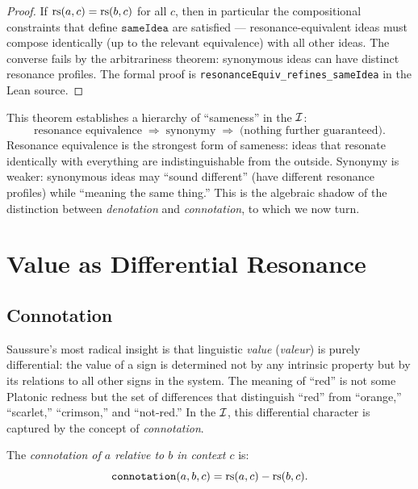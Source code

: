 \begin{proof}
If $\mathrm{rs}(a, c) = \mathrm{rs}(b, c)$ for all $c$, then in particular the
compositional constraints that define $\texttt{sameIdea}$ are
satisfied --- resonance-equivalent ideas must compose identically
(up to the relevant equivalence) with all other ideas. The converse
fails by the arbitrariness theorem: synonymous ideas can have
distinct resonance profiles. The formal proof is
\texttt{resonanceEquiv\_refines\_sameIdea} in the Lean source.
\end{proof}

\begin{interpretation}
This theorem establishes a hierarchy of ``sameness'' in the $\mathcal{I}$:
\[
  \text{resonance equivalence} \;\Longrightarrow\;
  \text{synonymy} \;\Longrightarrow\;
  \text{(nothing further guaranteed)}.
\]
Resonance equivalence is the strongest form of sameness: ideas that
resonate identically with everything are indistinguishable from the
outside. Synonymy is weaker: synonymous ideas may ``sound different''
(have different resonance profiles) while ``meaning the same thing.''
This is the algebraic shadow of the distinction between
\textit{denotation} and \textit{connotation}, to which we now turn.
\end{interpretation}

\section{Value as Differential Resonance}

\subsection{Connotation}

Saussure's most radical insight is that linguistic \emph{value}
(\textit{valeur}) is purely differential: the value of a sign is
determined not by any intrinsic property but by its relations to all
other signs in the system. The meaning of ``red'' is not some
Platonic redness but the set of differences that distinguish ``red''
from ``orange,'' ``scarlet,'' ``crimson,'' and ``not-red.'' In the
$\mathcal{I}$, this differential character is captured by the concept of
\emph{connotation}.

\begin{definition}[Connotation]
\label{def:connotation}
The \emph{connotation of $a$ relative to $b$ in context $c$} is:
\[
  \texttt{connotation}(a, b, c) = \mathrm{rs}(a, c) - \mathrm{rs}(b, c).
\]
\end{definition}


